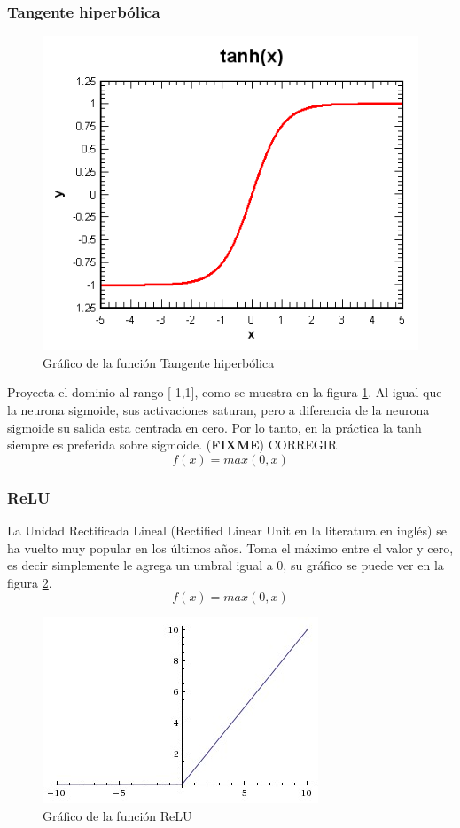 \documentclass[a4paper,11pt,spanish]{book}
\newcommand*{\FIXME}[1]{{(\textbf{FIXME}) {#1}}}
\begin{document}
	  \subsubsection {Tangente hiperbólica}
	    \begin{figure}[H]
	      \begin{center}
	       \includegraphics[width=0.4\linewidth]{./img/tanh.png}
	      \end{center}
	      \caption{Gráfico de la función Tangente hiperbólica}
	      \label{fig:tanh}
	    \end{figure}
	    Proyecta el dominio al rango [-1,1], como se muestra en la figura \ref{fig:tanh}. Al igual que la neurona sigmoide, sus activaciones saturan, pero a diferencia
	    de la neurona sigmoide su salida esta centrada en cero. Por lo tanto, en la práctica la tanh siempre es preferida sobre sigmoide.
	    \FIXME{CORREGIR}
	    \begin{equation*}
	     f(x) = max(0,x)
	    \end{equation*}

	  \subsubsection {ReLU}
	    La Unidad Rectificada Lineal (Rectified Linear Unit en la literatura en inglés) se ha vuelto muy popular en los últimos años. Toma el máximo entre el valor y cero, es decir
	    simplemente le agrega un umbral igual a 0, su gráfico se puede ver en la figura \ref{fig:relu}.
	    \begin{equation}
	     f(x) = max(0,x)
	    \end{equation}
	    \begin{figure}[H]
	      \begin{center}
	       \includegraphics[width=0.4\linewidth]{./img/relu.jpeg}
	      \end{center}
	      \caption{Gráfico de la función ReLU}
	      \label{fig:relu}
	    \end{figure}
\end{document}
